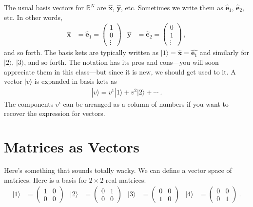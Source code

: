 \documentclass[12pt]{article}
\numberwithin{equation}{section}    %
\renewcommand{\vec}[1]{\mathbf{#1}} %
\begin{document}
The usual basis vectors for $\mathbb{R}^N$ are $\hat{\vec{x}}$, $\hat{\vec{y}}$, etc. Sometimes we write them as $\hat{\vec{e}}_1$, $\hat{\vec{e}}_2$, etc. In other words,
\begin{align}
	\hat{\vec{x}} &= \hat{\vec{e}}_1 = 
	\begin{pmatrix}
		1\\0\\ \vdots
	\end{pmatrix}
	&
	\hat{\vec{y}} &= \hat{\vec{e}}_2 = 
	\begin{pmatrix}
		0\\1\\ \vdots
	\end{pmatrix} \ ,
\end{align}
and so forth. The basis kets are typically written as $|1\rangle = \hat{\vec{x}} = \hat{\vec{e}_1}$ and similarly for $|2\rangle$, $|3\rangle$, and so forth. The notation has its pros and cons---you will soon appreciate them in this class---but since it is new, we should get used to it. A vector $|v\rangle$ is expanded in basis kets as
\begin{align}
	|v\rangle = v^1|1\rangle + v^2 |2\rangle + \cdots \ .
\end{align}
The components $v^i$ can be arranged as a column of numbers if you want to recover the expression for vectors.



\section{Matrices as Vectors}\label{sec:matrixspace}

Here's something that sounds totally wacky. We can define a vector space of matrices. Here is a basis for $2\times 2$ real matrices:
\begin{align}
	|1\rangle &= 
	\begin{pmatrix}
		1 & 0 \\ 0 & 0
	\end{pmatrix}
	&
	|2\rangle &= 
	\begin{pmatrix}
		0 & 1 \\ 0 & 0
	\end{pmatrix}
	&
	|3\rangle &= 
	\begin{pmatrix}
		0 & 0 \\ 1 & 0
	\end{pmatrix}
	&
	|4\rangle &= 
	\begin{pmatrix}
		0 & 0 \\ 0 & 1
	\end{pmatrix} \ .
	\label{eq:matrix:basis}
\end{align}
\end{document}
